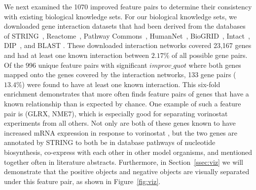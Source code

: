 We next examined the 1070 improved feature pairs to determine their consistency with existing biological knowledge sets. For our biological knowledge sets, we downloaded gene interaction datasets that had been derived from the databases of STRING~\cite{szklarczyk2014string}, Reactome~\cite{croft2013reactome}, Pathway Commons~\cite{cerami2010pathway}, HumanNet~\cite{lee2011prioritizing}, BioGRID~\cite{chatr2017biogrid}, Intact~\cite{orchard2013mintact}, DIP~\cite{salwinski2004database}, and BLAST . These downloaded interaction networks covered 23,167 genes and had at least one known interaction between $2.17\%$ of all possible gene pairs. Of the 996 unique feature pairs with significant $improv\_quot$ where both genes mapped onto the genes covered by the interaction networks, 133 gene pairs ($13.4\%$) were found to have at least one known interaction. This six-fold enrichment demonstrates that \genviz more often finds feature pairs of genes that have a known relationship than is expected by chance. One example of such a feature pair is (GLRX, NME7), which is especially good for separating vorinostat experiments from all others. Not only are both of these genes known to have increased mRNA expression in response to vorinostat , but the two genes are annotated by STRING to both be in database pathways of nucleotide biosynthesis, co-express with each other in other model organisms, and mentioned together often in literature abstracts.  Furthermore, in Section~\ref{ssec:viz} we will demonstrate that the positive objects and negative objects are visually separated under this feature pair, as shown in Figure~\ref{fig:viz}.

